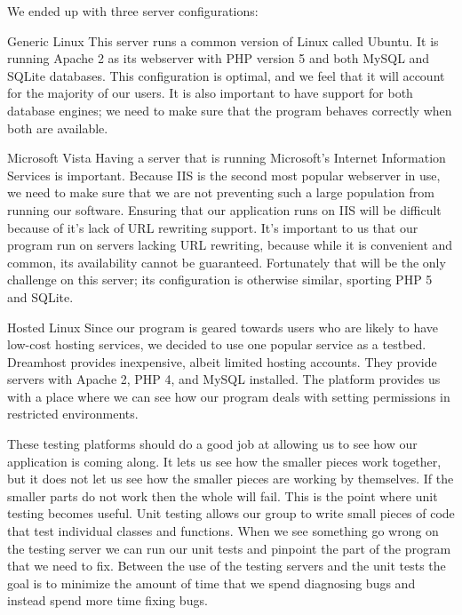 \documentclass[a4paper,12pt]{report}
\begin{document}
We ended up with three server configurations:
\begin{description}
	\item{Generic Linux} This server runs a common version of Linux called Ubuntu. It is running Apache 2 as its webserver with PHP version 5 and both MySQL and SQLite databases. This configuration is optimal, and we feel that it will account for the majority of our users. It is also important to have support for both database engines; we need to make sure that the program behaves correctly when both are available.
	\item{Microsoft Vista} Having a server that is running Microsoft's Internet Information Services is important. 
Because IIS is the second most popular webserver in use, we need to make sure that we are not preventing such a large population from running our software. Ensuring that our application runs on IIS will be difficult because of it's lack of URL rewriting support. It's important to us that our program run on servers lacking URL rewriting, because while it is convenient and common, its availability cannot be guaranteed. Fortunately that will be the only challenge on this server; its configuration is otherwise similar, sporting PHP 5 and SQLite.
	\item{Hosted Linux} Since our program is geared towards users who are likely to have low-cost hosting services, we decided to use one popular service as a testbed. Dreamhost provides inexpensive, albeit limited hosting accounts. They provide servers with Apache 2, PHP 4, and MySQL installed. The platform provides us with a place where we can see how our program deals with setting permissions in restricted environments.
\end{description}

These testing platforms should do a good job at allowing us to see how our application is coming along.
It lets us see how the smaller pieces work together, but it does not let us see how the smaller pieces are working by themselves.
If the smaller parts do not work then the whole will fail.
This is the point where unit testing becomes useful.
Unit testing allows our group to write small pieces of code that test individual classes and functions.
When we see something go wrong on the testing server we can run our unit tests and pinpoint the part of the program that we need to fix.
Between the use of the testing servers and the unit tests the goal is to minimize the amount of time that we spend diagnosing bugs and instead spend more time fixing bugs.
\end{document}
